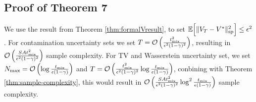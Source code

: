 \subsection{Proof of Theorem 7}
We use the result from Theorem \ref{thm:formalVresult}, to set $\mathbb{E}\Bigl[\|V_T - V^*\|^2_{\mathrm{sp}}\Bigr] \leq \epsilon^2$. For contamination uncertainty sets we set 
 $T=\operatorname*{\mathcal{O}}\left(\frac{t^2_{\mathrm{mix}}}{\epsilon^2(1-\gamma)^2} \right)$, resulting in $\operatorname*{\mathcal{O}}\left(\frac{SAt^2_{\mathrm{mix}}}{\epsilon^2(1-\gamma)^2} \right)$ sample complexity. For TV and Wasserstein uncertainty set, we set 
$N_{\max}=\operatorname*{\mathcal{O}}\left(\log \frac{t_{\mathrm{mix}}}{\epsilon(1-\gamma)}\right)$ and $T=\operatorname*{\mathcal{O}}\left(\frac{t^2_{\mathrm{mix}}}{\epsilon^2(1-\gamma)^2} \log\frac{t_{\mathrm{mix}}}{\epsilon(1-\gamma)}\right)$, conbining with Theorem \ref{thm:sample-complexity}, this would result in $\operatorname*{\mathcal{O}}\left(\frac{SAt^2_{\mathrm{mix}}}{\epsilon^2(1-\gamma)^2} \log^2\frac{t_{\mathrm{mix}}}{\epsilon(1-\gamma)}\right)$ sample complexity.
